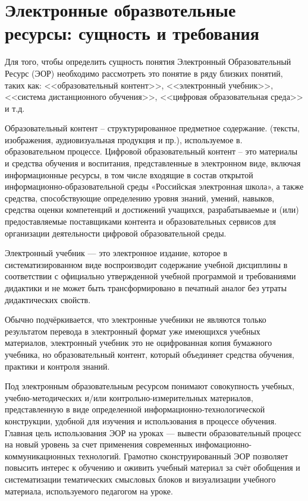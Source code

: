 \newpage
\large
\section {Электронные образвотельные ресурсы: сущность и требования}
Для того, чтобы определить сущность понятия Электронный Образовательный Ресурс (ЭОР) необходимо рассмотреть это понятие в ряду близких понятий, таких как: <<образовательный контент>>, <<электронный учебник>>, <<система дистанционного обучения>>, <<цифровая образовательная среда>> и т.д.

Образовательный контент – структурированное предметное содержание. (тексты, изображения, аудиовизуальная продукция и пр.), используемое в. образовательном процессе. 
Цифровой образовательный контент – это материалы и средства обучения и воспитания, представленные в электронном виде, включая информационные ресурсы, в том числе входящие в состав открытой информационно-образовательной среды «Российская электронная школа», а также средства, способствующие определению уровня знаний, умений, навыков, средства оценки компетенций и достижений учащихся, разрабатываемые и (или) предоставляемые поставщиками контента и образовательных сервисов для организации деятельности цифровой образовательной среды.

Электронный учебник --- это электронное издание, которое в систематизированном виде
воспроизводит содержание учебной дисциплины в соответствии с официально утвержденной учебной программой и требованиями дидактики и не может быть трансформировано в печатный аналог без утраты дидактических свойств\cite{balalaeva}. 

Обычно подчёркивается, что электронные учебники не являются
только результатом перевода в электронный формат уже имеющихся учебных
материалов, электронный учебник это не оцифрованная копия бумажного учебника, но образовательный контент, который объединяет средства обучения, практики и контроля знаний\cite[c.53]{blinov}.

Под электронным образовательным ресурсом понимают совокупность учебных, учебно-методических и/или контрольно-измерительных материалов, представленную в виде определенной информационно-технологической конструкции, удобной для изучения и
использования в процессе обучения\cite{jurkina20}. Главная цель использования ЭОР на уроках --- вывести образовательный процесс на новый уровень за счет применения современных инфомационно-коммуникационных технологий. Грамотно сконструированный ЭОР позволяет повысить интерес к обучению и оживить учебный материал за счёт обобщения и систематизации тематических смысловых блоков и визуализации учебного материала, используемого педагогом на уроке.

